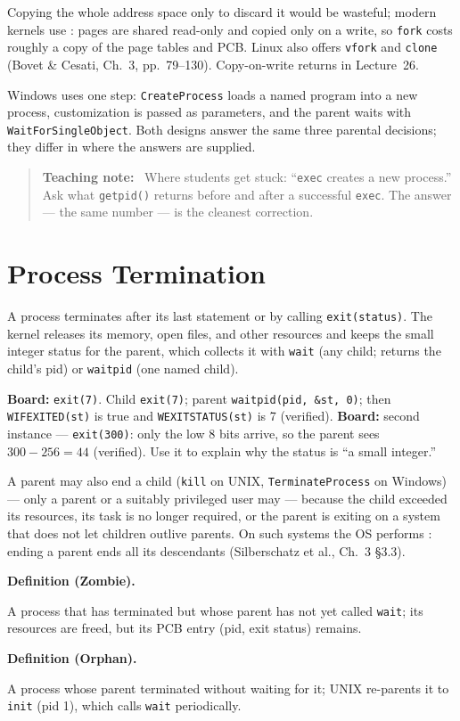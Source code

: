 \documentclass[11pt]{article}
\newenvironment{definitionbox}[1]{%
  \par\noindent\textbf{Definition (#1).}\ \itshape
}{\par\vspace{0.3em}}
\newenvironment{teachingaside}{\begin{quote}\small\color{primary-gold}\textbf{Teaching note:}\ }{\end{quote}}
\begin{document}
Copying the whole address space only to discard it would be wasteful; modern kernels use : pages are shared read-only and copied only on a write, so \texttt{fork} costs roughly a copy of the page tables and PCB. Linux also offers \texttt{vfork} and \texttt{clone} (Bovet \& Cesati, Ch.~3, pp.~79--130). Copy-on-write returns in Lecture~26.

Windows uses one step: \texttt{CreateProcess} loads a named program into a new process, customization is passed as parameters, and the parent waits with \texttt{WaitForSingleObject}. Both designs answer the same three parental decisions; they differ in where the answers are supplied.

\begin{teachingaside}
Where students get stuck: ``\texttt{exec} creates a new process.'' Ask what \texttt{getpid()} returns before and after a successful \texttt{exec}. The answer --- the same number --- is the cleanest correction.
\end{teachingaside}

\section{Process Termination}

A process terminates after its last statement or by calling \texttt{exit(status)}. The kernel releases its memory, open files, and other resources and keeps the small integer status for the parent, which collects it with \texttt{wait} (any child; returns the child's pid) or \texttt{waitpid} (one named child).

\textbf{Board:} \texttt{exit(7)}. Child \texttt{exit(7)}; parent \texttt{waitpid(pid, \&st, 0)}; then \texttt{WIFEXITED(st)} is true and \texttt{WEXITSTATUS(st)} is 7 (verified). \textbf{Board:} second instance --- \texttt{exit(300)}: only the low 8 bits arrive, so the parent sees $300 - 256 = 44$ (verified). Use it to explain why the status is ``a small integer.''

A parent may also end a child (\texttt{kill} on UNIX, \texttt{TerminateProcess} on Windows) --- only a parent or a suitably privileged user may --- because the child exceeded its resources, its task is no longer required, or the parent is exiting on a system that does not let children outlive parents. On such systems the OS performs : ending a parent ends all its descendants (Silberschatz et al., Ch.~3 \S3.3).

\begin{definitionbox}{Zombie}
A process that has terminated but whose parent has not yet called \texttt{wait}; its resources are freed, but its PCB entry (pid, exit status) remains.
\end{definitionbox}
\begin{definitionbox}{Orphan}
A process whose parent terminated without waiting for it; UNIX re-parents it to \texttt{init} (pid 1), which calls \texttt{wait} periodically.
\end{definitionbox}
\end{document}
